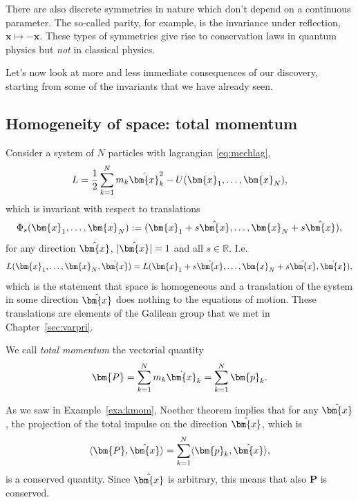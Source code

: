 \documentclass[english,fontsize=11pt,paper=a5,oneside]{scrbook}
\newcommand{\R}{\mathbb{R}}
\newcommand{\bx}{\bm{x}}
\newcommand{\lag}{\langle}
\newcommand{\rag}{\rangle}
\theoremstyle{definition}
\newenvironment{remark}
  {\pushQED{\qed}\renewcommand{\qedsymbol}{$\lozenge$}\remarkx}
  {\popQED\endremarkx}
\begin{document}
\begin{remark}
  There are also discrete symmetries in nature which don't depend on a continuous parameter. The so-called parity, for example, is the invariance under reflection, $\bx \mapsto -\bx$.
  These types of symmetries give rise to conservation laws in quantum physics but \emph{not} in classical physics.
\end{remark}

Let's now look at more and less immediate consequences of our discovery, starting from some of the invariants that we have already seen.

\subsection{Homogeneity of space: total momentum}

Consider a system of $N$ particles with lagrangian \eqref{eq:mechlag},
\begin{equation}
  L = \frac12 \sum_{k=1}^N m_k \dot \bx_k^2 - U(\bx_1, \ldots, \bx_N),
\end{equation}
which is invariant with respect to translations
\begin{equation}
  \Phi_s(\bx_1, \ldots, \bx_N) := (\bx_1 + s \hat \bx,\ldots, \bx_N + s \hat \bx),
\end{equation}
for any direction $\hat\bx$, $|\hat\bx|=1$ and all $s\in\R$. I.e.
\begin{equation}
  L(\bx_1, \ldots, \bx_N, \dot \bx) = L(\bx_1 + s \hat\bx, \ldots, \bx_N + s \hat\bx, \dot \bx),
\end{equation}
which is the statement that space is homogeneous and a translation of the system in some direction $\hat\bx$ does nothing to the equations of motion. These translations are elements of the Galilean group that we met in Chapter~\ref{sec:varpri}.

We call \emph{total momentum} the vectorial quantity
\begin{equation}
  \bm{P} = \sum_{k=1}^N m_k \dot \bx_k = \sum_{k=1}^N \bm{p}_k.
\end{equation}

As we saw in Example~\ref{exa:kmom}, Noether theorem implies that for any $\hat\bx$, the projection of the total impulse on the direction $\hat\bx$, which is
\begin{equation}
  \lag\bm{P}, \hat\bx\rag = \sum_{k=1}^N \lag \bm{p}_k, \hat\bx\rag,
\end{equation}
is a conserved quantity.
Since $\hat\bx$ is arbitrary, this means that also $\bm{P}$ is conserved.
\end{document}

